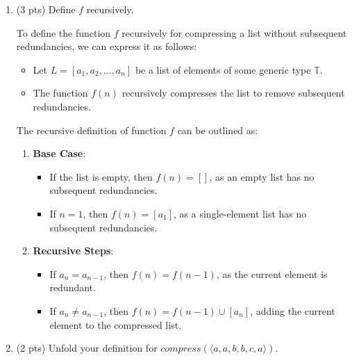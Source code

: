 \documentclass[12pt]{article}
\begin{document}
\begin{spacing}{1.5}
\begin{enumerate}
		\item (3 pts) Define $f$ recursively.
		      		      
		      To define the function $f$ recursively for compressing a list without subsequent redundancies, we can express it as follows: 
		      		      
		      \begin{itemize}
		      	\item Let $L = [a_1, a_2, ..., a_n]$ be a list of elements of some generic type $\mathbb{T}$.
		      	      		      	      
		      	\item The function $f(n)$ recursively compresses the list to remove subsequent redundancies.
		      \end{itemize}
		      		      
		      The recursive definition of function $f$ can be outlined as: 
		      		      
		      \begin{enumerate}
		      	\item \textbf{Base Case}: 
		      	      \begin{itemize}
		      	      	\item If the list is empty, then $f(n) = []$, as an empty list has no subsequent redundancies.
		      	      	      		      	      	                          
		      	      	\item If $n = 1$, then $f(n) = [a_1]$, as a single-element list has no subsequent redundancies.
		      	      \end{itemize}
		      	      		      	      
		      	\item \textbf{Recursive Steps}:
		      	      \begin{itemize}
		      	      	\item If $a_n = a_{n-1}$, then $f(n) = f(n-1)$, as the current element is redundant.
		      	      	      		      	      	      
		      	      	\item If $a_n \neq a_{n-1}$, then $f(n) = f(n-1) \cup [a_n]$, adding the current element to the compressed list.
		      	      \end{itemize}
		      \end{enumerate}
		      		      
		\item (2 pts) Unfold your definition for $compress(\langle a, a, b, b, c, a \rangle)$.
		      		      

\end{enumerate}
\end{spacing}
\end{document}
